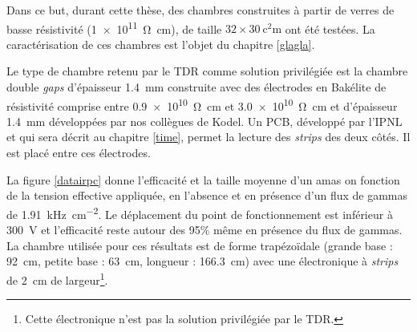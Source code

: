 Dans ce but, durant cette thèse, des chambres construites à partir de verres de basse résistivité (\SI{1e11}{\ohm\centi\meter}), de taille $\num{32}\times\SI{30}{\square\centi\meter}$ ont été testées. La caractérisation de ces chambres est l'objet du chapitre \ref{glagla}.


Le type de chambre retenu par le TDR comme solution privilégiée est la chambre double \textit{gaps} d'épaisseur \SI{1.4}{\milli\meter} construite avec des électrodes en Bakélite de résistivité comprise entre \SI{0.9e10}{\ohm\centi\meter} et \SI{3.0e10}{\ohm\centi\meter} et d'épaisseur \SI{1.4}{\milli\meter} développées par nos collègues de Kodel. Un PCB, développé par l'IPNL et qui sera décrit au chapitre \ref{time}, permet la lecture des \textit{strips} des deux côtés. Il est placé entre ces électrodes. 

La figure \ref{datairpc} donne l'efficacité et la taille moyenne d'un amas on fonction de la tension effective appliquée, en l'absence et en présence d'un flux de gammas de \SI{1.91}{\kilo\hertz\per\square\centi\meter}. Le déplacement du point de fonctionnement est inférieur à \SI{300}{\volt} et l'efficacité reste autour des \num{95}\% même en présence du flux de gammas. La chambre utilisée pour ces résultats est de forme trapézoïdale (grande base : \SI{92}{\centi\meter}, petite base : \SI{63}{\centi\meter}, longueur : \SI{166.3}{\centi\meter}) avec une électronique à \textit{strips} de \SI{2}{\centi\meter} de largeur\footnote{Cette électronique n'est pas la solution privilégiée par le TDR.}\cite{Lourenco:2283189}.

